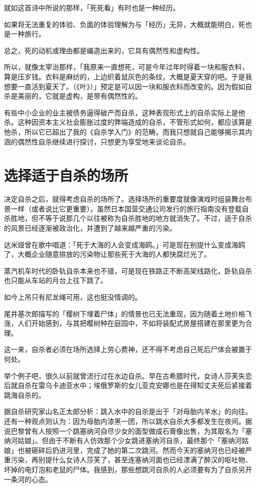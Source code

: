 \documentclass[UTF8]{ctexart}
\begin{document}
就如这首诗中所说的那样，「死死看」有时也是一种经历。

如果将无法重复的体验、负面的体验理解为与「经历」无异，大概就能明白，死也是一种旅行。

总之，死的动机或理由都是编造出来的，它具有偶然性和虚构性。

所以，就像太宰治那样，「我原来一直想死，可是今年过年时得着一块和服衣料，算是压岁钱。衣料是麻纺的，上边织着鼠灰色的条纹，大概是夏天穿的吧。于是我想要一直活到夏天了。（《叶》）」预定是可以因一块和服衣料而改变的。因为假如自杀是美丽的，它就是虚构，是带有偶然性的。

有些中小企业的业主被债务逼得破产而自杀，这种表现形式上的自杀实际上是他杀。这种因资本主义社会膨胀过度的弊端造成的自杀，不管形式如何，都应该算是他杀，所以它已超出了我的《自杀学入门》的范畴。而我只想就自己能够揭示其内涵的偶然性自杀继续进行探讨，只想更为享受地来谈论自杀。

\section{选择适于自杀的场所}

决定自杀之后，就得考虑自杀的场所了。选择场所的重要度就像演戏时组装舞台布景一样（或者说比它更重要）。虽然日本国营交通公司发行的旅行指南没有登载自杀胜地，但不等于说那几个以往被称为自杀胜地的地方就消失了。不过，适于自杀的风景已经逐渐被政治化，并遭到了越来越严重的污染。

达米娅曾在歌中唱道：「死于大海的人会变成海鸥。」可是现在别提什么变成海鸥了，大概企业随意排放的污染物让那些死于大海的人都快腐烂光了。

蒸汽机车时代的卧轨自杀本来也不错，可是现在铁路正不断高架线路化，卧轨自杀也只能从车站的月台上往下跳了。

如今上吊只有尼龙绳可用，这也挺没情调的。

尾井基次郎描写的「樱树下埋着尸体」的情景也已无法重现，因为随着土地价格飞涨，人们开始感到，与其把樱树种在庭园中，不如将装配式房屋搭建在那里更为合理。

这一来，自杀者必须在场所选择上劳心费神，还不得不考虑自己死后尸体会被置于何处。

举个例子吧，很久以前就曾流行过在水边自杀。早在古希腊时代，女诗人莎芙失恋后就自杀在雷乌卡迪亚水中；埃俄罗斯的女儿亚克安娜也是在得知丈夫死后紧接着跳海自杀的。

据自杀研究家山名正太郎分析：跳入水中的自杀是出于「对母胎内羊水」的向往。还有一种观点则认为：因为母胎内漆黑一团，所以跳水自杀大多都发生在夜间。据说巴黎曾有人按照一个跳塞纳河自尽少女的面型做成石膏像出售，为其取名为「塞纳河姑娘」。但由于不断有人仿效那个少女跳进塞纳河自杀，最终那个「塞纳河姑娘」也被砸碎后扔进河里，完成了她的第二次跳河。然而今天的塞纳河也已经被严重污染，再别提什么女诗人莎芙了，甚至连塞纳河面也已经漂满了醉汉的呕吐物、坏掉的电灯泡和老鼠的尸体。我感到，那些想跳河自杀的人必须要有为了自杀另开一条河的心态。
\end{document}
